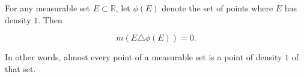 \begin{theorem}
For any measurable set $E \subset \mathbb{R}$, let $\phi(E)$ denote the set of points where $E$ has density $1$. Then

$$
m(E \triangle \phi(E)) = 0.
$$

In other words, almost every point of a measurable set is a point of density $1$ of that set.
\end{theorem}
